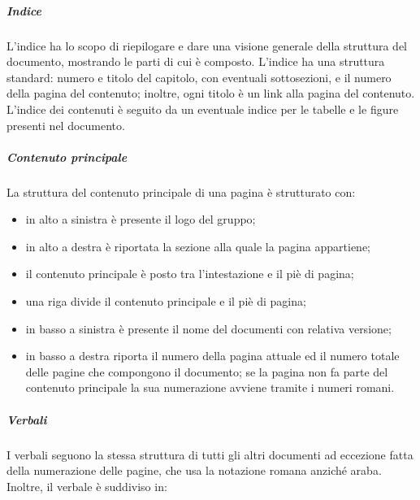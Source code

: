				\subparagraph{Indice}
					L'indice ha lo scopo di riepilogare e dare una visione generale della struttura del documento, mostrando le parti di cui è composto. L'indice ha una struttura standard: numero e titolo del capitolo, con eventuali sottosezioni, e il numero della pagina del contenuto; inoltre, ogni titolo è un link alla pagina del contenuto. L'indice dei contenuti è seguito da un eventuale indice per le tabelle e le figure presenti nel documento.
				\subparagraph{Contenuto principale}
					La struttura del contenuto principale di una pagina è strutturato con:
						\begin{itemize}
							\item in alto a sinistra è presente il logo del gruppo;
							\item in alto a destra è riportata la sezione alla quale la pagina appartiene;
							\item il contenuto principale è posto tra l'intestazione e il piè di pagina;
							\item una riga divide il contenuto principale e il piè di pagina;
							\item in basso a sinistra è presente il nome del documenti con relativa versione;
							\item in basso a destra riporta il numero della pagina attuale ed il numero totale delle pagine che compongono il documento; se la pagina non fa parte del contenuto principale la sua numerazione avviene tramite i numeri romani.
						\end{itemize}
				\subparagraph{Verbali}
					  I verbali seguono la stessa struttura di tutti gli altri documenti ad eccezione fatta della numerazione delle pagine, che usa la notazione romana anziché araba. Inoltre, il verbale è suddiviso in:
